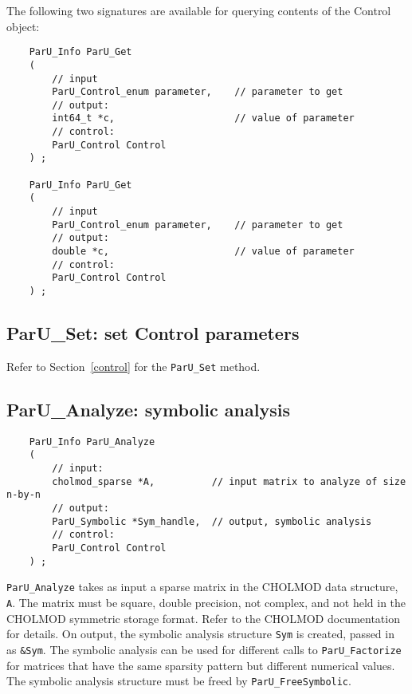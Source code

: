 \documentclass[12pt]{article}
\begin{document}
The following two signatures are available for querying contents of the
Control object:

    {\footnotesize
    \begin{verbatim}
    ParU_Info ParU_Get
    (
        // input
        ParU_Control_enum parameter,    // parameter to get
        // output:
        int64_t *c,                     // value of parameter
        // control:
        ParU_Control Control
    ) ;

    ParU_Info ParU_Get
    (
        // input
        ParU_Control_enum parameter,    // parameter to get
        // output:
        double *c,                      // value of parameter
        // control:
        ParU_Control Control
    ) ; \end{verbatim}}

\subsection{{\sf ParU\_Set}: set Control parameters}
\label{set}

Refer to Section~\ref{control} for the \verb'ParU_Set' method.

\subsection{{\sf ParU\_Analyze}: symbolic analysis}

    {\footnotesize
    \begin{verbatim}
    ParU_Info ParU_Analyze
    (
        // input:
        cholmod_sparse *A,          // input matrix to analyze of size n-by-n
        // output:
        ParU_Symbolic *Sym_handle,  // output, symbolic analysis
        // control:
        ParU_Control Control
    ) ; \end{verbatim}}

    \verb'ParU_Analyze' takes as input a sparse matrix in the CHOLMOD data
    structure, \verb'A'.  The matrix must be square, double precision, not
    complex, and not held in the CHOLMOD symmetric storage format.  Refer to
    the CHOLMOD documentation for details.  On output, the symbolic analysis
    structure \verb'Sym' is created, passed in as \verb'&Sym'.  The symbolic
    analysis can be used for different calls to \verb'ParU_Factorize' for
    matrices that have the same sparsity pattern but different numerical
    values.  The symbolic analysis structure must be freed by
    \verb'ParU_FreeSymbolic'.
\end{document}
